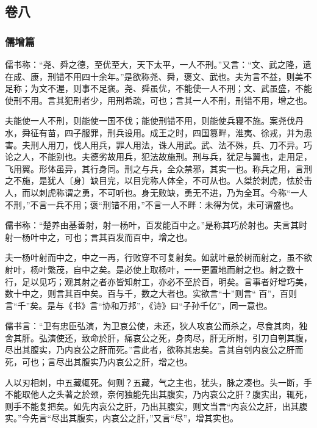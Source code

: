 \documentclass[]{article}
\begin{document}
\hypertarget{header-n308}{%
\subsection{卷八}\label{header-n308}}

\hypertarget{header-n309}{%
\subsubsection{儒增篇}\label{header-n309}}

儒书称：``尧、舜之德，至优至大，天下太平，一人不刑。''又言：``文、武之隆，遗在成、康，刑错不用四十余年。''是欲称尧、舜，褒文、武也。夫为言不益，则美不足称；为文不渥，则事不足褒。尧、舜虽优，不能使一人不刑；文、武虽盛，不能使刑不用。言其犯刑者少，用刑希疏，可也；言其一人不刑，刑错不用，增之也。

夫能使一人不刑，则能使一国不伐；能使刑错不用，则能使兵寝不施。案尧伐丹水，舜征有苗，四子服罪，刑兵设用。成王之时，四国篡畔，淮夷、徐戎，并为患害。夫刑人用刀，伐人用兵，罪人用法，诛人用武。武、法不殊，兵、刀不异。巧论之人，不能别也。夫德劣故用兵，犯法故施刑。刑与兵，犹足与翼也，走用足，飞用翼。形体虽异，其行身同。刑之与兵，全众禁邪，其实一也。称兵之用，言刑之不施，是犹人〔身〕缺目完，以目完称人体全，不可从也。人桀於刺虎，怯於击人，而以刺虎称谓之勇，不可听也。身无败缺，勇无不进，乃为全耳。今称``一人不刑，''不言一兵不用；褒``刑错不用，''不言一人不畔：未得为优，未可谓盛也。

儒书称：``楚养由基善射，射一杨叶，百发能百中之。''是称其巧於射也。夫言其时射一杨叶中之，可也；言其百发而百中，增之也。

夫一杨叶射而中之，中之一再，行败穿不可复射矣。如就叶悬於树而射之，虽不欲射叶，杨叶繁茂，自中之矣。是必使上取杨叶，一一更置地而射之也。射之数十行，足以见巧；观其射之者亦皆知射工，亦必不至於百，明矣。言事者好增巧美，数十中之，则言其百中矣。百与千，数之大者也。实欲言``十''则言``
百''，百则言``千''矣。是与《书》言``协和万邦''，《诗》曰``子孙千亿''，同一意也。

儒书言：``卫有忠臣弘演，为卫哀公使，未还，狄人攻哀公而杀之，尽食其肉，独舍其肝。弘演使还，致命於肝，痛哀公之死，身肉尽，肝无所附，引刀自刳其腹，尽出其腹实，乃内哀公之肝而死。''言此者，欲称其忠矣。言其自刳内哀公之肝而死，可也；言尽出其腹实乃内哀公之肝，增之也。

人以刃相刺，中五藏辄死。何则？五藏，气之主也，犹头，脉之凑也。头一断，手不能取他人之头著之於颈，奈何独能先出其腹实，乃内哀公之肝？腹实出，辄死，则手不能复把矣。如先内哀公之肝，乃出其腹实，则文当言``内哀公之肝，出其腹实。''今先言``尽出其腹实，内哀公之肝，''又言``尽''，增其实也。
\end{document}
